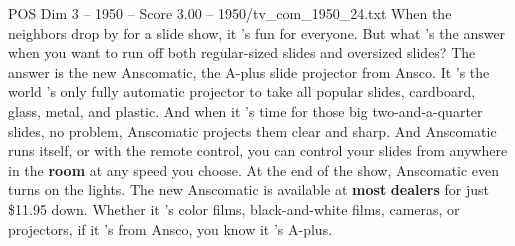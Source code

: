 \begin{textsample}{POS Dim 3 – 1950 – Score 3.00 – 1950/tv\_com\_1950\_24.txt}  \label{ex:f3_pos_016}
When the neighbors drop by for a slide show, it 's fun for everyone.
But what 's the answer when you want to run off both regular-sized slides and oversized slides?
The answer is the new Anscomatic, the A-plus slide projector from Ansco.
It 's the world 's only fully automatic projector to take all popular slides, cardboard, glass, metal, and plastic.
And when it 's time for those big two-and-a-quarter slides, no problem, Anscomatic projects them clear and sharp.
And Anscomatic runs itself, or with the remote control, you can control your slides from anywhere in the \textbf{room} at any speed you choose.
At the end of the show, Anscomatic even turns on the lights.
The new Anscomatic is available at \textbf{most} \textbf{dealers} for just \$11.95 down.
Whether it 's color films, black-and-white films, cameras, or projectors, if it 's from Ansco, you know it 's A-plus.

\end{textsample}
